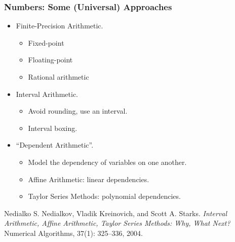 \begin{frame}

\frametitle{Numbers: Some (Universal) Approaches}

\begin{itemize}

\item Finite-Precision Arithmetic.

\begin{itemize}

\item Fixed-point

\item Floating-point

\item Rational arithmetic

\end{itemize}

\item Interval Arithmetic.

\begin{itemize}

\item Avoid rounding, use an interval.

\item Interval boxing.

\end{itemize}

\item ``Dependent Arithmetic''.

\begin{itemize}

\item Model the dependency of variables on one another.

\item Affine Arithmetic: linear dependencies.

\item Taylor Series Methods: polynomial dependencies.

\end{itemize}

\end{itemize}

\vspace{\fill}

\footnotesize

\begin{thebibliography}{9}

 Nedialko S. Nedialkov, Vladik Kreinovich, and
Scott A. Starks. \emph{Interval Arithmetic, Affine Arithmetic, Taylor Series
Methods: Why, What Next?} Numerical Algorithms, 37(1): 325--336, 2004.

\end{thebibliography}

\end{frame}
